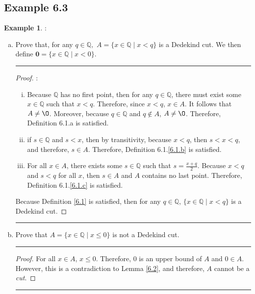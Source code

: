\documentclass[openany, amssymb, psamsfonts]{amsart}
\newcommand{\bbQ}{\mathbb{Q}}
\renewcommand{\emptyset}{\O}
\theoremstyle{definition}
\newtheorem{exmp}{Example}[section]
\numberwithin{equation}{section}
\begin{document}
\subsection*{Example 6.3}
\label{6.3}
\begin{exmp}:\\
    	\begin{enumerate}[(a)]
		\item Prove that, for any $q\in \bbQ,$ $A = \{x\in\bbQ\mid x< q\}$ is a Dedekind cut. We then define  $\mathbf{0} = \{x \in \bbQ \mid x < 0\}.$
\vspace{4pt}     \hrule   \vspace{4pt} \begin{proof} :\\
    \begin{enumerate} [(i)]
    \item Because $\bbQ$ has no first point, then for any $q\in \bbQ$, there must exist some $x\in \bbQ$ such that $x<q$. Therefore, since $x<q$, $x\in A$. It follows that $A\neq \emptyset$. Moreover, because $q\in \bbQ$ and $q\notin A$, $A\neq \emptyset$. Therefore, Definition 6.1.a is satisfied.
    \item if $s\in \bbQ$ and $s<x$, then by transitivity, because $x<q$, then $s<x<q$, and therefore, $s\in A$. Therefore, Definition 6.1.\ref{6.1.b} is satisfied.
    \item For all $x\in A$, there exists some $s\in \bbQ$ such that $s = \frac{x+q}{2}$. Because $x<q$ and $s<q$ for all $x$, then $s\in A$ and $A$ contains no last point. Therefore, Definition 6.1.\ref{6.1.c} is satisfied.
\end{enumerate}
Because Definition \ref{6.1} is satisfied, then for any $q\in \bbQ$, $\{x\in\bbQ\mid x< q\}$ is a Dedekind cut.
\end{proof} \vspace{4pt}     \hrule   \vspace{4pt}
\item Prove that $A = \{x \in \bbQ \mid x \leq 0\}$ is not a Dedekind cut.
\vspace{4pt}     \hrule   \vspace{4pt} \begin{proof} 
For all $x\in A$, $x\leq 0$. Therefore, $0$ is an upper bound of $A$ and $0\in A$. However, this is a contradiction to Lemma \ref{6.2}, and therefore, $A$ cannot be a \textit{cut}.
\end{proof} \vspace{4pt}     \hrule   \vspace{4pt}

\end{enumerate}
\end{exmp}
\end{document}
